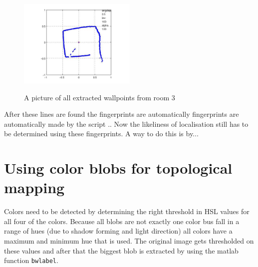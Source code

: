 \documentclass[a4paper, 20pt]{article}
\begin{document}
\begin{figure}[!ht]
\centering
  \includegraphics[width=0.5\textwidth]{Results/points_room3.jpg}
  \label{fig:wallpoints}
  \caption{A picture of all extracted wallpoints from room 3} 
\end{figure}

After these lines are found the fingerprints are automatically  fingerprints are
automatically made by the script ..  Now the likeliness of localisation still
has to be determined using these fingerprints. A way to do this is by...

\section{Using color blobs for topological mapping}
Colors need to be detected by determining the right threshold in HSL values for
all four of the colors. Because all blobs are not exactly one color bus fall in
a range of hues (due to shadow forming and light direction) all colors have a
maximum and minimum hue that is used.  
The original image gets thresholded on these values and
after that the biggest blob is extracted by using the matlab function
\texttt{bwlabel}.
\end{document}
